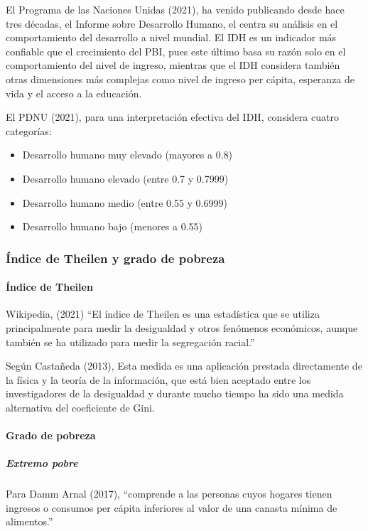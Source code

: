 El Programa de las Naciones Unidas (2021), ha venido publicando desde hace tres décadas, el Informe sobre Desarrollo Humano, el centra su análisis en el comportamiento del desarrollo a nivel mundial. El IDH es un indicador más confiable que el crecimiento del PBI, pues este último basa su razón solo en el comportamiento del nivel de ingreso, mientras que el IDH considera también otras dimensiones más complejas como nivel de ingreso per cápita, esperanza de vida y el acceso a la educación. 

El PDNU (2021), para una interpretación efectiva del IDH, considera cuatro categorías: 

\begin{itemize}
\item Desarrollo humano muy elevado (mayores a 0.8)
\item Desarrollo humano elevado (entre 0.7 y 0.7999)
\item Desarrollo humano medio (entre 0.55 y 0.6999)
\item Desarrollo humano bajo (menores a 0.55)

\end{itemize}

  \subsubsection{Índice de Theilen y grado de pobreza}

    \paragraph{Índice de Theilen}
Wikipedia, (2021) “El índice de Theilen es una estadística que se utiliza principalmente para medir la desigualdad y otros fenómenos económicos, aunque también se ha utilizado para medir la segregación racial.”
 
Según Castañeda (2013), Esta medida es una aplicación prestada directamente de la física y la teoría de la información, que está bien aceptado entre los investigadores de la desigualdad y durante mucho tiempo ha sido una medida alternativa del coeficiente de Gini.

    \paragraph{Grado de pobreza}

  \subparagraph{Extremo pobre}

Para Damm Arnal (2017), “comprende a las personas cuyos hogares tienen ingresos o consumos per cápita inferiores al valor de una canasta mínima de alimentos.”

